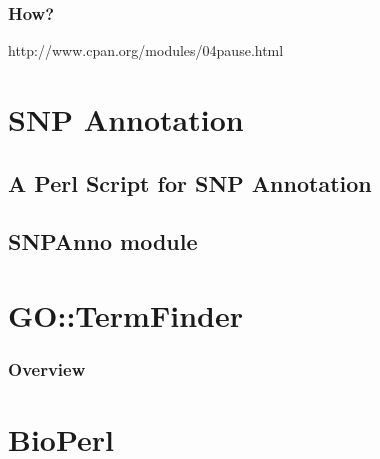 \documentclass[UTF8]{beamer}
\begin{document}
\begin{frame}
  \frametitle{How?}
  http://www.cpan.org/modules/04pause.html
\end{frame}

\section{SNP Annotation}

\subsection{A Perl Script for SNP Annotation}

\subsection{SNPAnno module}

\section{GO::TermFinder}

\begin{frame}
  \frametitle{Overview}
\end{frame}

\begin{frame}
  \frametitle{}
\end{frame}

\section{BioPerl}
\end{document}
